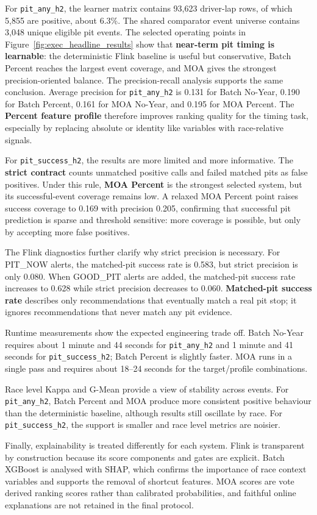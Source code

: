 For \texttt{pit\_any\_h2}, the learner matrix contains 93,623 driver-lap rows, of which 5,855 are positive, about 6.3\%. The shared comparator 
event universe contains 3,048 unique eligible pit events. The selected operating points in Figure~\ref{fig:exec_headline_results} show that 
\textbf{near-term pit timing is learnable}: the deterministic Flink baseline is useful but conservative, Batch Percent reaches the largest event 
coverage, and MOA gives the strongest precision-oriented balance. The precision-recall analysis supports the same conclusion. Average precision for 
\texttt{pit\_any\_h2} is 0.131 for Batch No-Year, 0.190 for Batch Percent, 0.161 for MOA No-Year, and 0.195 for MOA Percent. The \textbf{Percent 
feature profile} therefore improves ranking quality for the timing task, especially by replacing absolute or identity like variables with 
race-relative signals.

For \texttt{pit\_success\_h2}, the results are more limited and more informative. The \textbf{strict contract} counts unmatched positive calls and 
failed matched pits as false positives. Under this rule, \textbf{MOA Percent} is the strongest selected system, but its successful-event coverage 
remains low. A relaxed MOA Percent point raises success coverage to 0.169 with precision 0.205, confirming that successful pit prediction is sparse 
and threshold sensitive: more coverage is possible, but only by accepting more false positives.

The Flink diagnostics further clarify why strict precision is necessary. For PIT\_NOW alerts, the matched-pit success rate is 0.583, but strict 
precision is only 0.080. When GOOD\_PIT alerts are added, the matched-pit success rate increases to 0.628 while strict precision decreases to 0.060. 
\textbf{Matched-pit success rate} describes only recommendations that eventually match a real pit stop; it ignores recommendations that never match 
any pit evidence.

Runtime measurements show the expected engineering trade off. Batch No-Year requires about 1 minute and 44 seconds for \texttt{pit\_any\_h2} and 1 
minute and 41 seconds for \texttt{pit\_success\_h2}; Batch Percent is slightly faster. MOA runs in a single pass and requires about 18--24 seconds 
for the target/profile combinations.

Race level Kappa and G-Mean provide a view of stability across events. For \texttt{pit\_any\_h2}, Batch Percent and MOA produce more consistent 
positive behaviour than the deterministic baseline, although results still oscillate by race. For \texttt{pit\_success\_h2}, the support is smaller 
and race level metrics are noisier.

Finally, explainability is treated differently for each system. Flink is transparent by construction because its score components and gates are explicit. 
Batch XGBoost is analysed with SHAP, which confirms the importance of race context variables and supports the removal of shortcut features. MOA scores 
are vote derived ranking scores rather than calibrated probabilities, and faithful online explanations are not retained in the final protocol.

